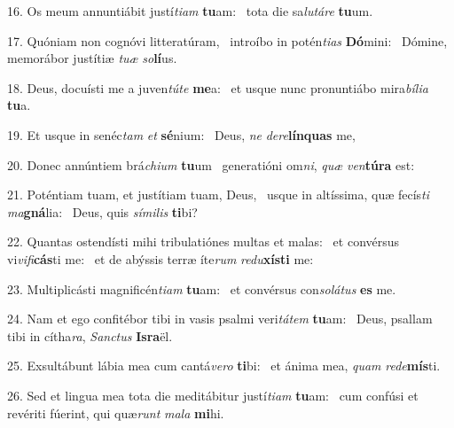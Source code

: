 16. Os meum annuntiábit justí\textit{ti}\textit{am} \textbf{tu}am: \ast\  tota die sa\textit{lu}\textit{tá}\textit{re} \textbf{tu}um.\

17. Quóniam non cognóvi litteratúram, \dag\  introíbo in potén\textit{ti}\textit{as} \textbf{Dó}mini: \ast\  Dómine, memorábor justítiæ \textit{tu}\textit{æ} \textit{so}\textbf{lí}us.\

18. Deus, docuísti me a juven\textit{tú}\textit{te} \textbf{me}a: \ast\  et usque nunc pronuntiábo mira\textit{bí}\textit{li}\textit{a} \textbf{tu}a.\

19. Et usque in senéc\textit{tam} \textit{et} \textbf{sé}nium: \ast\  Deus, \textit{ne} \textit{de}\textit{re}\textbf{lín}\textbf{quas} me,\

20. Donec annúntiem brá\textit{chi}\textit{um} \textbf{tu}um \ast\  generatióni om\textit{ni}, \textit{quæ} \textit{ven}\textbf{tú}\textbf{ra} est:\

21. Poténtiam tuam, et justítiam tuam, Deus, \dag\  usque in altíssima, quæ fecís\textit{ti} \textit{ma}\textbf{gná}lia: \ast\  Deus, quis \textit{sí}\textit{mi}\textit{lis} \textbf{ti}bi?\

22. Quantas ostendísti mihi tribulatiónes multas et malas: \dag\  et convérsus vi\textit{vi}\textit{fi}\textbf{cás}ti me: \ast\  et de abýssis terræ íte\textit{rum} \textit{re}\textit{du}\textbf{xís}\textbf{ti} me:\

23. Multiplicásti magnificén\textit{ti}\textit{am} \textbf{tu}am: \ast\  et convérsus con\textit{so}\textit{lá}\textit{tus} \textbf{es} me.\

24. Nam et ego confitébor tibi in vasis psalmi veri\textit{tá}\textit{tem} \textbf{tu}am: \ast\  Deus, psallam tibi in cítha\textit{ra}, \textit{Sanc}\textit{tus} \textbf{Is}\textbf{ra}ël.\

25. Exsultábunt lábia mea cum cantá\textit{ve}\textit{ro} \textbf{ti}bi: \ast\  et ánima mea, \textit{quam} \textit{red}\textit{e}\textbf{mís}ti.\

26. Sed et lingua mea tota die meditábitur justí\textit{ti}\textit{am} \textbf{tu}am: \ast\  cum confúsi et revériti fúerint, qui quæ\textit{runt} \textit{ma}\textit{la} \textbf{mi}hi.\


